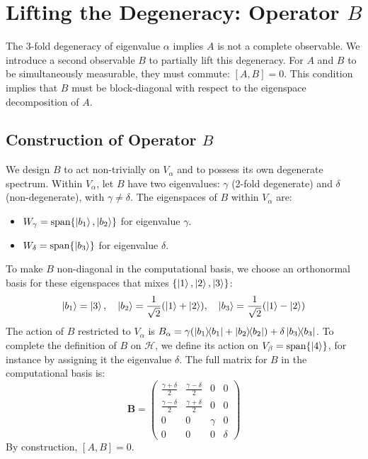 \documentclass[11pt,a4paper]{article}
\begin{document}
\section{Lifting the Degeneracy: Operator \texorpdfstring{$B$}{B}}

The 3-fold degeneracy of eigenvalue $\alpha$ implies $A$ is not a complete
observable. We introduce a second observable $B$ to partially lift this
degeneracy. For $A$ and $B$ to be simultaneously measurable, they must commute:
$[A,B]=0$. This condition implies that $B$ must be block-diagonal with respect
to the eigenspace decomposition of $A$.

\subsection{Construction of Operator \texorpdfstring{$B$}{B}}
We design $B$ to act non-trivially on $V_\alpha$ and to possess its own
degenerate spectrum. Within $V_\alpha$, let $B$ have two eigenvalues: $\gamma$
(2-fold degenerate) and $\delta$ (non-degenerate), with $\gamma \neq \delta$.
The eigenspaces of $B$ within $V_\alpha$ are:
\begin{itemize}
  \item $W_\gamma = \text{span}\{\ket{b_1}, \ket{b_2}\}$ for eigenvalue $\gamma$.
  \item $W_\delta = \text{span}\{\ket{b_3}\}$ for eigenvalue $\delta$.
\end{itemize}
To make $B$ non-diagonal in the computational basis, we choose an orthonormal
basis for these eigenspaces that mixes $\{\ket{1}, \ket{2}, \ket{3}\}$:
$$
\ket{b_1} = \ket{3}, \quad \ket{b_2} = \frac{1}{\sqrt{2}}(\ket{1}+\ket{2}),
\quad \ket{b_3} = \frac{1}{\sqrt{2}}(\ket{1}-\ket{2})
$$
The action of $B$ restricted to $V_\alpha$ is $B_\alpha = \gamma(\dyad{b_1}{b_1}
+ \dyad{b_2}{b_2}) + \delta\dyad{b_3}{b_3}$. To complete the definition of $B$
on $\mathcal{H}$, we define its action on $V_\beta=\text{span}\{\ket{4}\}$, for
instance by assigning it the eigenvalue $\delta$. The full matrix for $B$ in the
computational basis is:
$$
\mathbf{B} = \begin{pmatrix}
  \frac{\gamma+\delta}{2} & \frac{\gamma-\delta}{2} & 0 & 0 \\
  \frac{\gamma-\delta}{2} & \frac{\gamma+\delta}{2} & 0 & 0 \\
  0 & 0 & \gamma & 0 \\
  0 & 0 & 0 & \delta
\end{pmatrix}
$$
By construction, $[A,B]=0$.
\end{document}
